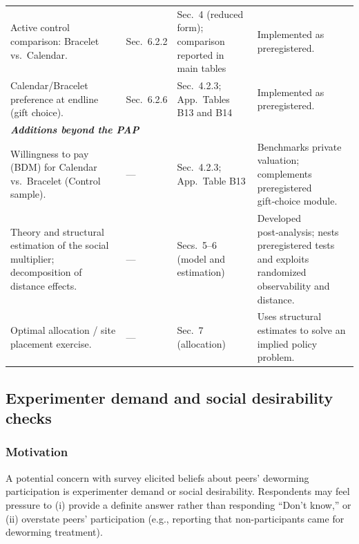 \documentclass[12pt,a4paper]{article}
\begin{document}
\begin{ThreePartTable}
\begin{longtable}{p{} p{} p{} p{}}
Active control comparison: Bracelet vs.\ Calendar. &
Sec.\ 6.2.2 &
Sec.\ 4 (reduced form); comparison reported in main tables &
Implemented as preregistered. \\

Calendar/Bracelet preference at endline (gift choice). &
Sec.\ 6.2.6 &
Sec.\ 4.2.3; App.\ Tables B13 and B14 &
Implemented as preregistered. \\[0.35em]

\multicolumn{4}{l}{\textit{\textbf{Additions beyond the PAP}}}\\[0.15em]

Willingness to pay (BDM) for Calendar vs.\ Bracelet (Control sample). &
— &
Sec.\ 4.2.3; App.\ Table B13 &
Benchmarks private valuation; complements preregistered gift‑choice module. \\

Theory and structural estimation of the social multiplier; decomposition of distance effects. &
— &
Secs.\ 5–6 (model and estimation) &
Developed post‑analysis; nests preregistered tests and exploits randomized observability and distance. \\

Optimal allocation / site placement exercise. &
— &
Sec.\ 7 (allocation) &
Uses structural estimates to solve an implied policy problem. \\

\end{longtable}
\end{ThreePartTable}
\endgroup



\newpage

\FloatBarrier
\newpage

\setcounter{table}{0}
\renewcommand{\thetable}{F\arabic{table}}

\setcounter{figure}{0}
\renewcommand{\thefigure}{F\arabic{figure}}



\renewcommand{\thesubsection}{\Alph{subsection}}


\subsection{Experimenter demand and social desirability checks}
\label{app:demand_checks}

\subsubsection*{Motivation}
A potential concern with survey elicited beliefs about peers' deworming participation is experimenter demand or social desirability. Respondents may feel pressure to (i) provide a definite answer rather than responding ``Don't know,'' or (ii) overstate peers' participation (e.g., reporting that non-participants came for deworming treatment).
\end{document}
